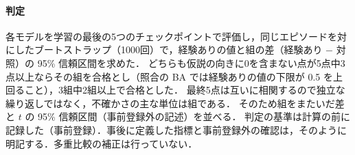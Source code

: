 \paragraph{判定}各モデルを学習の最後の5つのチェックポイントで評価し，同じエピソードを対にしたブートストラップ（1000回）で，経験ありの値と組の差（経験あり $-$ 対照）の 95\% 信頼区間を求めた．
どちらも仮説の向きに0を含まない点が5点中3点以上ならその組を合格とし（照合の BA では経験ありの値の下限が 0.5 を上回ること），3組中2組以上で合格とした．
最終5点は互いに相関するので独立な繰り返しではなく，不確かさの主な単位は組である．
そのため組をまたいだ差と $t$ の 95\% 信頼区間（事前登録外の記述）を並べる．
判定の基準は計算の前に記録した（事前登録）．事後に定義した指標と事前登録外の確認は，そのように明記する．多重比較の補正は行っていない．
